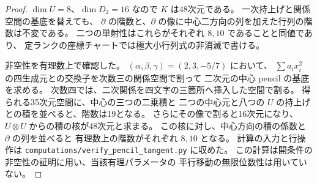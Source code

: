 \begin{proof}
$\dim U=8$、$\dim D_2=16$ なので $K$ は48次元である。
一次持上げと関係空間の基底を替えても、
$\partial$ の階数と、$\partial$ の像に中心二方向の列を加えた行列の階数は不変である。
二つの単射性はこれらがそれぞれ $8,10$ であることと同値であり、
定ランクの座標チャートでは極大小行列式の非消滅で書ける。

非空性を有理数上で確認した。
$(\alpha,\beta,\gamma)=(2,3,-5/7)$ において、
$\sum a_i x_i^2$ の四生成元との交換子を次数三の関係空間で割って
二次元の中心 pencil の基底を求める。
次数四では、二次関係を四文字の三箇所へ挿入した空間で割る。
得られる35次元空間に、中心の三つの二乗積と
二つの中心元と八つの $U$ の持上げとの積を並べると、階数は19となる。
さらにその像で割ると16次元になり、
$U\otimes U$ からの積の核が48次元と求まる。
この核に対し、中心方向の積の係数と $\partial$ の列を並べると
有理数上の階数がそれぞれ $8,10$ となる。
計算の入力と行操作は
\texttt{computations/verify\_pencil\_tangent.py} に収めた。
この計算は開条件の非空性の証明に用い、当該有理パラメータの
平行移動の無限位数性は用いていない。
\end{proof}
